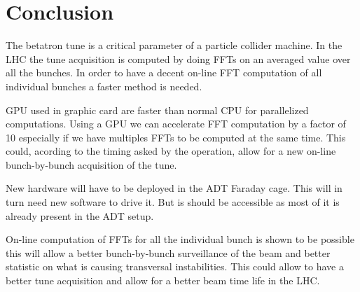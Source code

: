 
\chapter{Conclusion}


The betatron \gls{tune} is a critical parameter of a particle collider machine. In the \gls{LHC} the \gls{tune} acquisition is computed by doing \glspl{FFT} on an averaged value over all the bunches. In order to have a decent on-line \gls{FFT} computation of all individual bunches a faster method is needed. 

\Gls{GPU} used in graphic card are faster than normal \gls{CPU} for parallelized computations. Using a \gls{GPU} we can accelerate \gls{FFT} computation by a factor of 10 especially if we have multiples \glspl{FFT} to be computed at the same time. This could, acording to the timing asked by the operation, allow for a new on-line bunch-by-bunch acquisition of the \gls{tune}.

New hardware will have to be deployed in the \gls{ADT} Faraday cage. This will in turn need new software to drive it. But is should be accessible as most of it is already present in the \gls{ADT} setup.

On-line computation of \glspl{FFT} for all the individual bunch is shown to be possible this will allow a better bunch-by-bunch surveillance of the beam and better statistic on what is causing transversal instabilities. This could allow to have a better tune acquisition and allow for a better beam time life in the \gls{LHC}.